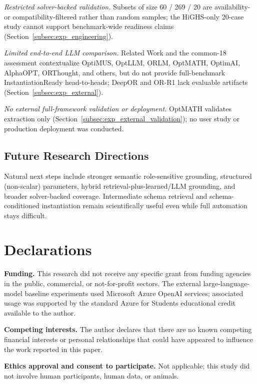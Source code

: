 \documentclass[pdflatex,sn-basic,Numbered]{sn-jnl}
\begin{document}
\emph{Restricted solver-backed validation.} Subsets of size 60 / 269 / 20 are availability- or compatibility-filtered rather than random samples; the HiGHS-only 20-case study cannot support benchmark-wide readiness claims (Section~\ref{subsec:exp_engineering}).

\emph{Limited end-to-end LLM comparison.} Related Work and the common-18 assessment contextualize OptiMUS, OptLLM, ORLM, OptMATH, OptimAI, AlphaOPT, ORThought, and others, but do not provide full-benchmark InstantiationReady head-to-heads; DeepOR and OR-R1 lack evaluable artifacts (Section~\ref{subsec:exp_external}).

\emph{No external full-framework validation or deployment.} OptMATH validates extraction only (Section~\ref{subsec:exp_external_validation}); no user study or production deployment was conducted.

\subsection{Future Research Directions}
\label{subsec:future_work}

Natural next steps include stronger semantic role-sensitive grounding, structured (non-scalar) parameters, hybrid retrieval-plus-learned/LLM grounding, and broader solver-backed coverage. Intermediate schema retrieval and schema-conditioned instantiation remain scientifically useful even while full automation stays difficult.


\backmatter

\section*{Declarations}

\noindent\textbf{Funding.} This research did not receive any specific grant from funding agencies in the public, commercial, or not-for-profit sectors. The external large-language-model baseline experiments used Microsoft Azure OpenAI services; associated usage was supported by the standard Azure for Students educational credit available to the author.

\noindent\textbf{Competing interests.} The author declares that there are no known competing financial interests or personal relationships that could have appeared to influence the work reported in this paper.

\noindent\textbf{Ethics approval and consent to participate.} Not applicable; this study did not involve human participants, human data, or animals.
\end{document}
